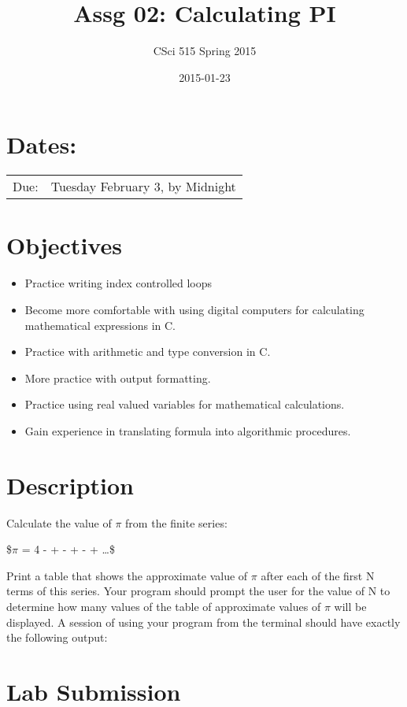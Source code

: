 \documentclass[11pt]{article}
\title{Assg 02: Calculating PI}
\author{CSci 515 Spring 2015}
\date{2015-01-23}
\begin{document}
\maketitle


\section*{Dates:}
\label{sec-1}


\begin{center}
\begin{tabular}{ll}
 Due:  &  Tuesday February 3, by Midnight  \\
\end{tabular}
\end{center}
\section*{Objectives}
\label{sec-2}

\begin{itemize}
\item Practice writing index controlled loops
\item Become more comfortable with using digital computers for calculating mathematical expressions in C.
\item Practice with arithmetic and type conversion in C.
\item More practice with output formatting.
\item Practice using real valued variables for mathematical calculations.
\item Gain experience in translating formula into algorithmic procedures.
\end{itemize}
\section*{Description}
\label{sec-3}

Calculate the value of $\pi$ from the finite series:

\$$\pi$ = 4 -  +  -  +  -  + \ldots{}\$

Print a table that shows the approximate value of $\pi$ after each of
the first N terms of this series.  Your program should prompt the user
for the value of N to determine how many values of the table of
approximate values of $\pi$ will be displayed.  A session of using
your program from the terminal should have exactly the following
output:
\section*{Lab Submission}
\label{sec-4}
\end{document}
